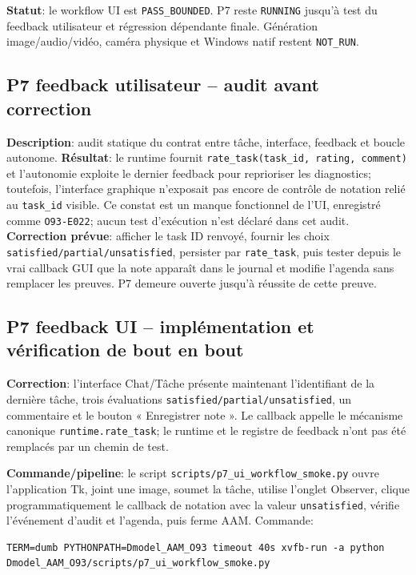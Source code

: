 \documentclass[11pt,a4paper,oneside]{report}
\begin{document}
\textbf{Statut}: le workflow UI est \texttt{PASS\_BOUNDED}. P7 reste \texttt{RUNNING} jusqu’à test du feedback utilisateur et régression dépendante finale. Génération image/audio/vidéo, caméra physique et Windows natif restent \texttt{NOT\_RUN}.


\subsection{P7 feedback utilisateur -- audit avant correction}
\textbf{Description}: audit statique du contrat entre tâche, interface, feedback et boucle autonome.
\textbf{Résultat}: le runtime fournit \texttt{rate\_task(task\_id, rating, comment)} et l’autonomie exploite le dernier feedback pour reprioriser les diagnostics; toutefois, l’interface graphique n’exposait pas encore de contrôle de notation relié au \texttt{task\_id} visible. Ce constat est un manque fonctionnel de l’UI, enregistré comme \texttt{O93-E022}; aucun test d’exécution n’est déclaré dans cet audit.
\textbf{Correction prévue}: afficher le task ID renvoyé, fournir les choix \texttt{satisfied/partial/unsatisfied}, persister par \texttt{rate\_task}, puis tester depuis le vrai callback GUI que la note apparaît dans le journal et modifie l’agenda sans remplacer les preuves. P7 demeure ouverte jusqu’à réussite de cette preuve.


\subsection{P7 feedback UI -- implémentation et vérification de bout en bout}
\textbf{Correction}: l’interface Chat/Tâche présente maintenant l’identifiant de la dernière tâche, trois évaluations \texttt{satisfied/partial/unsatisfied}, un commentaire et le bouton « Enregistrer note ». Le callback appelle le mécanisme canonique \texttt{runtime.rate\_task}; le runtime et le registre de feedback n’ont pas été remplacés par un chemin de test.

\textbf{Commande/pipeline}: le script \texttt{scripts/p7\_ui\_workflow\_smoke.py} ouvre l’application Tk, joint une image, soumet la tâche, utilise l’onglet Observer, clique programmatiquement le callback de notation avec la valeur \texttt{unsatisfied}, vérifie l’événement d’audit et l’agenda, puis ferme AAM. Commande: \begin{lstlisting}[basicstyle=\ttfamily\small,breaklines=true]
TERM=dumb PYTHONPATH=Dmodel_AAM_O93 timeout 40s xvfb-run -a python Dmodel_AAM_O93/scripts/p7_ui_workflow_smoke.py
\end{lstlisting}
\end{document}
